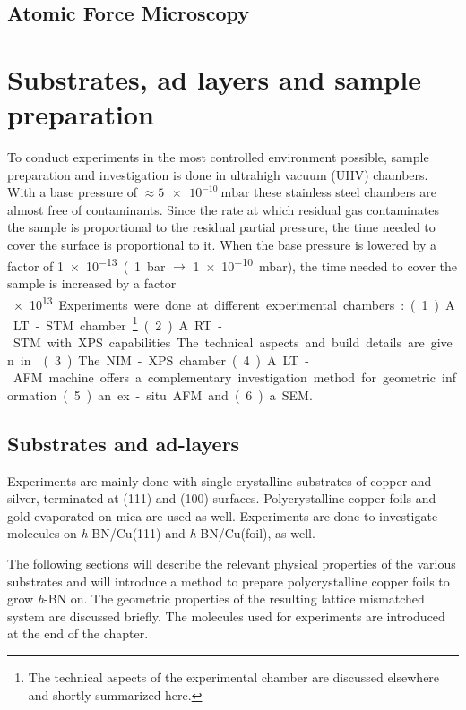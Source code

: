 \documentclass[
10pt,					%
a4paper,				%
twoside,				%
BCOR=8mm,				%
headings=normal,		%
headsepline,			%
footsepline,			%
plainfootsepline,		%
]{scrbook}
\begin{document}
  \section{\textbf{A}tomic \textbf{F}orce \textbf{M}icroscopy}
	
\chapter{Substrates, ad layers and sample preparation}
To conduct experiments in the most controlled environment possible, sample preparation and investigation is done in ultrahigh vacuum (UHV) chambers. With a base pressure of $\approx \SI{5e-10}{\milli \bar}$ these stainless steel chambers are almost free of contaminants. Since the rate at which residual gas contaminates the sample is proportional to the residual partial pressure, the time needed to cover the surface is proportional to it. When the base pressure is lowered by a factor of \SI{1e-13} (\SI{1}{\bar} $\rightarrow$ \SI{1e-10}{\milli \bar}), the time needed to cover the sample is increased by a factor \SI{e13}. 

Experiments were done at different experimental chambers: (1) A LT-STM chamber. \footnote{The technical aspects of the experimental chamber are discussed elsewhere \cite{urgel_tendero_two-dimensional_2015, schwarz_assembly_2018, wiengarten_scanning_2015} and shortly summarized here.} (2) A RT-STM with XPS capabilities. The technical aspects and build details are given in \cite{schwarz_assembly_2018}. (3) The NIM-XPS chamber. 
(4) A LT-AFM machine offers a complementary investigation method for geometric information. (5) an ex-situ AFM and (6) a SEM.


  \section{Substrates and ad-layers}
Experiments are mainly done with single crystalline substrates of copper and silver, terminated at (111) and (100) surfaces. Polycrystalline copper foils and gold evaporated on mica are used as well. Experiments are done to investigate molecules on \textit{h}-BN/Cu(111) and \textit{h}-BN/Cu(foil), as well.

The following sections will describe the relevant physical properties of the various substrates and will introduce a method to prepare polycrystalline copper foils to grow \textit{h}-BN on. The geometric properties of the resulting lattice mismatched system are discussed briefly. The molecules used for experiments are introduced at the end of the chapter.
\end{document}
